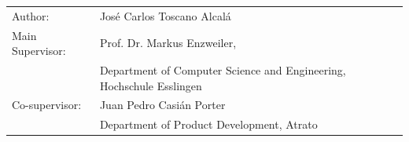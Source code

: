 \begin{titlepage}
	\begin{table}[h!]
		\begin{small} \sffamily
			\begin{tabular}{p{}p{}}
				Author: & José Carlos Toscano Alcalá \\
				Main Supervisor:    & Prof. Dr. Markus Enzweiler, \\
				& Department of Computer Science and Engineering, Hochschule Esslingen \\
				Co-supervisor:      & Juan Pedro Casián Porter \\
				& Department of Product Development, Atrato \\
				
			\end{tabular}
		\end{small}
	\end{table}
	
\end{titlepage}